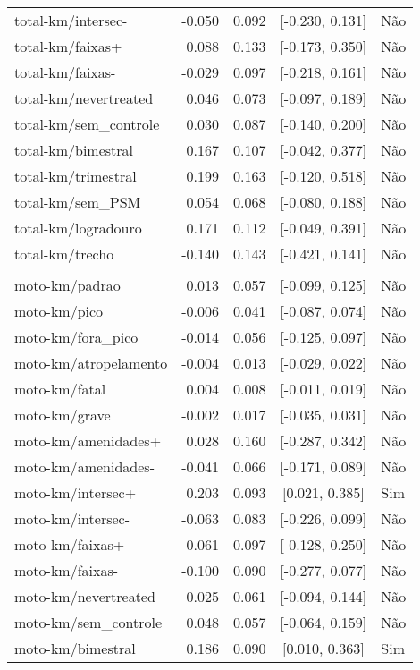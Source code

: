 \begin{longtable}{lrrcl}
total-km/intersec- & -0.050 & 0.092 & {}[-0.230, 0.131] & Não\\
total-km/faixas+ & 0.088 & 0.133 & {}[-0.173, 0.350] & Não\\
total-km/faixas- & -0.029 & 0.097 & {}[-0.218, 0.161] & Não\\
total-km/nevertreated & 0.046 & 0.073 & {}[-0.097, 0.189] & Não\\
total-km/sem\_controle & 0.030 & 0.087 & {}[-0.140, 0.200] & Não\\
total-km/bimestral & 0.167 & 0.107 & {}[-0.042, 0.377] & Não\\
total-km/trimestral & 0.199 & 0.163 & {}[-0.120, 0.518] & Não\\
total-km/sem\_PSM & 0.054 & 0.068 & {}[-0.080, 0.188] & Não\\
total-km/logradouro & 0.171 & 0.112 & {}[-0.049, 0.391] & Não\\
total-km/trecho & -0.140 & 0.143 & {}[-0.421, 0.141] & Não\\
 &  &  &  & \\
moto-km/padrao & 0.013 & 0.057 & {}[-0.099, 0.125] & Não\\
moto-km/pico & -0.006 & 0.041 & {}[-0.087, 0.074] & Não\\
moto-km/fora\_pico & -0.014 & 0.056 & {}[-0.125, 0.097] & Não\\
moto-km/atropelamento & -0.004 & 0.013 & {}[-0.029, 0.022] & Não\\
moto-km/fatal & 0.004 & 0.008 & {}[-0.011, 0.019] & Não\\
moto-km/grave & -0.002 & 0.017 & {}[-0.035, 0.031] & Não\\
moto-km/amenidades+ & 0.028 & 0.160 & {}[-0.287, 0.342] & Não\\
moto-km/amenidades- & -0.041 & 0.066 & {}[-0.171, 0.089] & Não\\
moto-km/intersec+ & 0.203 & 0.093 & {}[0.021, 0.385] & Sim\\
moto-km/intersec- & -0.063 & 0.083 & {}[-0.226, 0.099] & Não\\
moto-km/faixas+ & 0.061 & 0.097 & {}[-0.128, 0.250] & Não\\
moto-km/faixas- & -0.100 & 0.090 & {}[-0.277, 0.077] & Não\\
moto-km/nevertreated & 0.025 & 0.061 & {}[-0.094, 0.144] & Não\\
moto-km/sem\_controle & 0.048 & 0.057 & {}[-0.064, 0.159] & Não\\
moto-km/bimestral & 0.186 & 0.090 & {}[0.010, 0.363] & Sim\\

\end{longtable}

